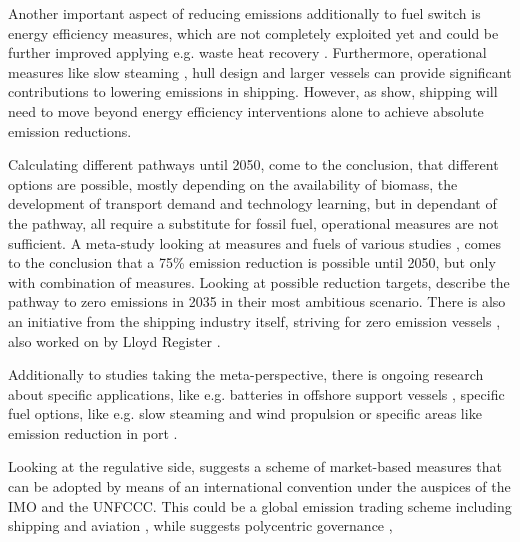 \documentclass[article]{elsarticle}
\begin{document}
Another important aspect of reducing emissions additionally to fuel switch is energy efficiency measures, which are not completely exploited yet \cite{JAFARZADEH2014,CHI2018} and could be further improved applying e.g. waste heat recovery \cite{Baldi2015}. Furthermore, operational measures like slow steaming \cite{ARMSTRONG2013}, hull design and larger vessels \cite{LINDSTAD2015} can provide significant contributions to lowering emissions in shipping. However, as \cite{Olmer2017} show, shipping will need to move beyond energy efficiency interventions alone to achieve absolute emission reductions.

Calculating different pathways until 2050, \cite{LloydsRegister2016} come to the conclusion, that different options are possible, mostly depending on the availability of biomass, the development of transport demand and technology learning, but in dependant of the pathway, all require a substitute for fossil fuel, operational measures are not sufficient. A meta-study looking at measures and fuels of various studies \cite{Bouman2017}, comes to the conclusion that a  75\% emission reduction is possible until 2050, but only with combination of measures. Looking at possible reduction targets, \cite{Smith2016} describe the pathway to zero emissions in 2035 in their most ambitious scenario. There is also an initiative from the shipping industry itself, striving for zero emission vessels \cite{SSI2018}, also worked on by Lloyd Register \cite{LloydsRegister2017}. 

Additionally to studies taking the meta-perspective, there is ongoing research about specific applications, like e.g. batteries in offshore support vessels \cite{Lindstad2017}, specific fuel options, like e.g. slow steaming and wind propulsion \cite{MANDER2017} or specific areas like emission reduction in port \cite{WINNES2015}.

Looking at the regulative side, \cite{SHI2016} suggests a scheme of market-based measures that can be adopted by means of an international convention under the auspices of the IMO and the UNFCCC. This could be a global emission trading scheme including shipping and aviation \cite{Dessens2014}, while \cite{GRITSENKO2017} suggests polycentric governance \cite{},
\end{document}
